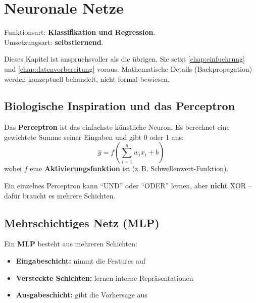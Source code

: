 \chapter{Neuronale Netze}
\label{chap:neuronale-netze}

\begin{myremark}
Funktionsart: \textbf{Klassifikation und Regression}. \\
Umsetzungsart: \textbf{selbstlernend}.
\end{myremark}

\begin{myremark}
Dieses Kapitel ist anspruchsvoller als die übrigen.
Sie setzt  \cref{chap:einfuehrung} und  \cref{chap:datenvorbereitung} voraus. Mathematische Details (Backpropagation) werden
konzeptuell behandelt, nicht formal bewiesen.
\end{myremark}

\section{Biologische Inspiration und das Perceptron}

\begin{mydefinition}[Perceptron]
Das \textbf{Perceptron} ist das einfachste künstliche Neuron.
Es berechnet eine gewichtete Summe seiner Eingaben und gibt 0 oder 1 aus:
\[
\hat{y} = f\!\left(\sum_{i=1}^{n} w_i x_i + b\right)
\]
wobei $f$ eine \textbf{Aktivierungsfunktion} ist (z.\,B. Schwellenwert-Funktion).
\end{mydefinition}

\begin{myexample}
Ein einzelnes Perceptron kann \enquote{UND} oder \enquote{ODER} lernen,
aber \textbf{nicht} XOR -- dafür braucht es mehrere Schichten.
\end{myexample}

\section{Mehrschichtiges Netz (MLP)}

\begin{mydefinition}
Ein \textbf{MLP} besteht aus mehreren Schichten:
\begin{itemize}
    \item \textbf{Eingabeschicht:} nimmt die Features auf
    \item \textbf{Versteckte Schichten:} lernen interne Repräsentationen
    \item \textbf{Ausgabeschicht:} gibt die Vorhersage aus
\end{itemize}
\end{mydefinition}

